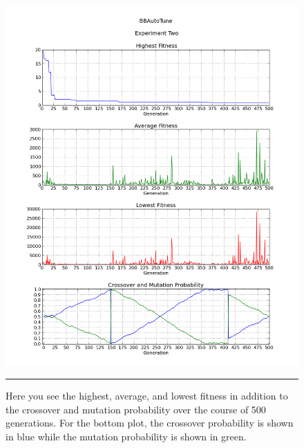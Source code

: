 \begin{figure}[htbp]
\centering
\includegraphics[width=5in]{../Figures/Chapter4/exp2_halcm.png}
\rule{35em}{0.5pt}
\caption[Experiment Two GA Metrics]{Here you see the highest, average, and lowest fitness in addition to the crossover and mutation probability over the course of 500 generations. For the bottom plot, the crossover probability is shown in blue while the mutation probability is shown in green.}
\label{fig:exp2_halcm}
\end{figure}

